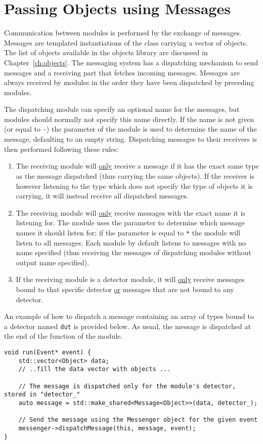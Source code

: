 \section{Passing Objects using Messages}
\label{sec:objects_messages}
Communication between modules is performed by the exchange of messages.
Messages are templated instantiations of the  class carrying a vector of objects.
The list of objects available in the \apsq objects library are discussed in Chapter~\ref{ch:objects}.
The messaging system has a dispatching mechanism to send messages and a receiving part that fetches incoming messages.
Messages are always received by modules in the order they have been dispatched by preceding modules.

The dispatching module can specify an optional name for the messages, but modules should normally not specify this name directly.
If the name is not given (or equal to \texttt{-}) the  parameter of the module is used to determine the name of the message, defaulting to an empty string.
Dispatching messages to their receivers is then performed following these rules:
\begin{enumerate}
    \item The receiving module will \underline{only} receive a message if it has the exact same type as the message dispatched (thus carrying the same objects).
    If the receiver is however listening to the  type which does not specify the type of objects it is carrying, it will instead receive all dispatched messages.
    \item The receiving module will \underline{only} receive messages with the exact name it is listening for.
    The module uses the  parameter to determine which message names it should listen for; if the  parameter is equal to \texttt{*} the module will listen to all messages.
    Each module by default listens to messages with no name specified (thus receiving the messages of dispatching modules without output name specified).
    \item If the receiving module is a detector module, it will \underline{only} receive messages bound to that specific detector \underline{or} messages that are not bound to any detector.
\end{enumerate}

An example of how to dispatch a message containing an array of  types bound to a detector named \texttt{dut} is provided below.
As usual, the message is dispatched at the end of the  function of the module.
\begin{verbatim}
void run(Event* event) {
    std::vector<Object> data;
    // ..fill the data vector with objects ...

    // The message is dispatched only for the module's detector, stored in "detector_"
    auto message = std::make_shared<Message<Object>>(data, detector_);

    // Send the message using the Messenger object for the given event
    messenger->dispatchMessage(this, message, event);
}
\end{verbatim}

